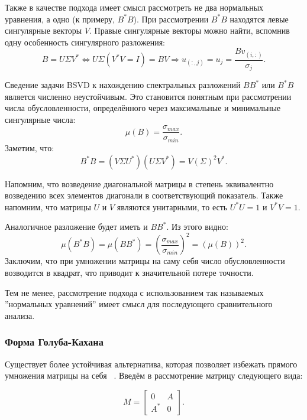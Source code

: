 Также в качестве подхода имеет смысл рассмотреть не два нормальных уравнения, а одно (к примеру, $B^*B$). При рассмотрении $B^*B$ находятся левые сингулярные векторы $V$. Правые сингулярные векторы можно найти, вспомнив одну особенность сингулярного разложения:
\begin{equation*}
     B=U \Sigma V^* \Leftrightarrow U\Sigma(V^*V=I)=BV \Rightarrow u_{(:,j)}=u_j= \frac{Bv_{(i,:)}}{\sigma_j}.
\end{equation*}


Сведение задачи BSVD к нахождению спектральных разложений \( B B^* \) или \( B^* B \) является численно неустойчивым. Это становится понятным при рассмотрении числа обусловленности, определённого через максимальные и минимальные сингулярные числа:
\[\mu(B) = \frac{\sigma_{max}}{\sigma_{min}}.\]
Заметим, что:
\[ B^*B=(V\Sigma U^*)(U \Sigma V^*)=V (\Sigma)^2 V^*. \]

\begin{note}
    Напомним, что возведение диагональной матрицы в степень эквивалентно возведению всех элементов диагонали в соответствующий показатель. Также напомним, что матрицы \(U\) и \(V\) являются унитарными, то есть \(U^*U=1\) и \(V^*V=1\).
\end{note}

Аналогичное разложение будет иметь и \(BB^*\). Из этого видно:
\[ \mu(B^*B) = \mu(BB^*) = \left( \frac{\sigma_{max}}{\sigma_{min}} \right)^2 =(\mu(B))^2.\]
Заключим, что при умножении матрицы на саму себя число обусловленности возводится в квадрат, что приводит к значительной потере точности. 

Тем не менее, рассмотрение подхода с использованием так называемых ''нормальных уравнений'' имеет смысл для последующего сравнительного анализа.

\subsubsection{Форма Голуба-Кахана}

Существует более устойчивая альтернатива, которая позволяет избежать прямого умножения матрицы на себя ~\cite{mr3_algo4triagonal_sym_eigen_and_bidiagSVD}. Введём в рассмотрение матрицу следующего вида:

\begin{equation}
M = \begin{bmatrix} 0 & A \\ A^* & 0 \end{bmatrix}.
\end{equation}

